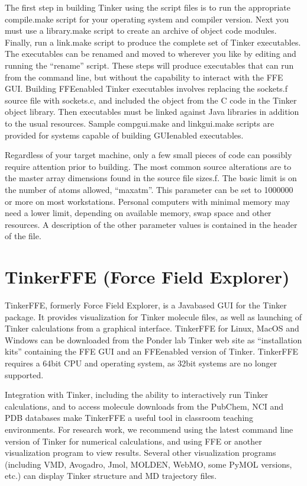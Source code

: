 \documentclass[letterpaper,11pt,english]{sphinxmanual}
\begin{document}
The first step in building Tinker using the script files is to run the appropriate compile.make script for your operating system and compiler version. Next you must use a library.make script to create an archive of object code modules. Finally, run a link.make script to produce the complete set of Tinker executables. The executables can be renamed and moved to wherever you like by editing and running the “rename” script. These steps will produce executables that can run from the command line, but without the capability to interact with the FFE GUI. Building FFE\sphinxhyphen{}enabled Tinker executables involves replacing the sockets.f source file with sockets.c, and included the object from the C code in the Tinker object library. Then executables must be linked against Java libraries in addition to the usual resources. Sample compgui.make and linkgui.make scripts are provided for systems capable of building GUI\sphinxhyphen{}enabled executables.

Regardless of your target machine, only a few small pieces of code can possibly require attention prior to building. The most common source alterations are to the master array dimensions found in the source file sizes.f. The basic limit is on the number of atoms allowed, “maxatm”. This parameter can be set to 1000000 or more on most workstations. Personal computers with minimal memory may need a lower limit, depending on available memory, swap space and other resources. A description of the other parameter values is contained in the header of the file.


\section{Tinker\sphinxhyphen{}FFE (Force Field Explorer)}
\label{\detokenize{text/installation:tinker-ffe-force-field-explorer}}
Tinker\sphinxhyphen{}FFE, formerly Force Field Explorer, is a Java\sphinxhyphen{}based GUI for the Tinker package. It provides visualization for Tinker molecule files, as well as launching of Tinker calculations from a graphical interface. Tinker\sphinxhyphen{}FFE for Linux, MacOS and Windows can be downloaded from the Ponder lab Tinker web site as “installation kits” containing the FFE GUI and an FFE\sphinxhyphen{}enabled version of Tinker. Tinker\sphinxhyphen{}FFE requires a 64\sphinxhyphen{}bit CPU and operating system, as 32\sphinxhyphen{}bit systems are no longer supported.

Integration with Tinker, including the ability to interactively run Tinker calculations, and to access molecule downloads from the PubChem, NCI and PDB databases make Tinker\sphinxhyphen{}FFE a useful tool in classroom teaching environments. For research work, we recommend using the latest command line version of Tinker for numerical calculations, and using FFE or another visualization program to view results. Several other visualization programs (including VMD, Avogadro, Jmol, MOLDEN, WebMO, some PyMOL versions, etc.) can display Tinker structure and MD trajectory files.
\end{document}
